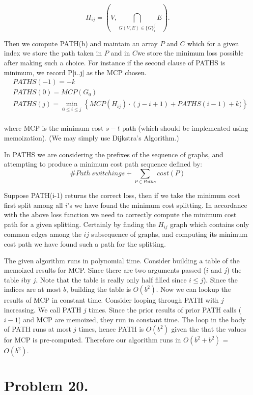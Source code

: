 \documentclass{amsart}
\theoremstyle{definition}
\theoremstyle{remark}
\numberwithin{equation}{section}
\begin{document}
$$ H_{ij} = \left( V, \bigcap_{G(V,E) \in \{G\}_{i}^j} E \right). $$

Then we compute PATH(b) and maintain an array $P$ and $C$ which for a given index we store the path taken in $P$ and in $C$we store the minimum loss possible after making such a choice. For instance if the second clause of PATHS is minimum, we record P[i..j] as the MCP chosen.
\algstar
\begin{align*}
  & PATHS(-1) = -k \\
  & PATHS(0) = MCP(G_0) \\
  & PATHS(j) = \min_{0 \leq i \leq j} \left\{ MCP(H_{ij}) \cdot (j-i+1) + PATHS(i-1) + k) \right\} \\
\end{align*}

where MCP is the minimum cost $s-t$ path (which should be implemented using memoization). (We may simply use Dijkstra's Algorithm.)

In PATHS we are considering the prefixes of the sequence of graphs, and attempting to produce a minimum cost path sequence defined by:
$$\# Path\ switchings + \sum_{P \in Paths} cost(P)$$

Suppose PATH(i-1) returns the correct loss, then if we take the minimum cost first split among all $i$'s we have found the minimum cost splitting. In accordance with the above loss function we need to correctly compute the minimum cost path for a given splitting. Certainly by finding the $H_{ij}$ graph which contains only common edges among the $ij$ subsequence of graphs, and computing its minimum cost path we have found such a path for the splitting.

\claimstar The given algorithm runs in polynomial time.
Consider building a table of the memoized results for MCP. Since there are two arguments passed ($i$ and $j$) the table $i$by $j$. Note that the table is really only half filled since $i \leq j$). Since the indices are at  most $b$, building the table is $O(b^2)$. Now we can lookup the results of MCP in constant time. Consider looping through PATH with $j$ increasing. We call PATH $j$ times. Since the prior results of prior PATH calls ($i-1$) and MCP are memoized, they run in constant time. The loop in the body of PATH runs at most $j$ times, hence PATH is $O(b^2)$ given the that the values for MCP is pre-computed. Therefore our algorithm runs in $O(b^2 + b^2)$ = $O(b^2)$.

\section{Problem 20.}
\end{document}
